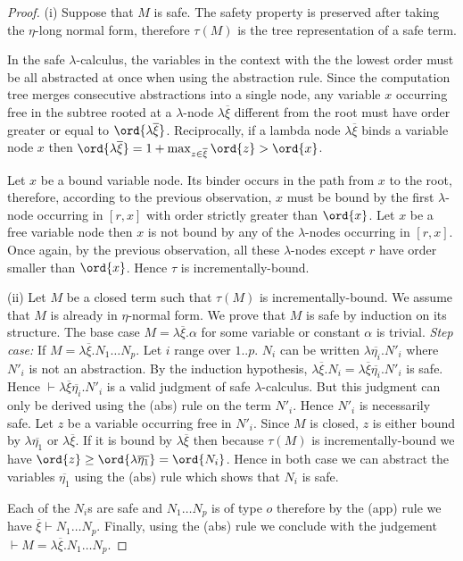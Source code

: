 \begin{proof}
(i) Suppose that $M$ is safe. The safety property is preserved after
taking the $\eta$-long normal form, therefore $\tau(M)$ is the tree representation of a safe term.

In the safe $\lambda$-calculus, the variables in the context with the the lowest order must be all abstracted
at once when using the abstraction rule. Since the computation
tree merges consecutive abstractions into a single node,
any variable $x$ occurring free in the subtree rooted at a $\lambda$-node $\lambda \overline{\xi}$ different from the root
must have order greater or equal to $\ord{\lambda \overline{\xi}}$. Reciprocally, if a lambda node
$\lambda \overline{\xi}$ binds a variable node $x$ then
$\ord{\lambda \overline{\xi}} = 1+\max_{z\in\overline{\xi}} \ord{z} > \ord{x}$.

Let $x$ be a bound variable node. Its binder occurs in the path from $x$
to the root, therefore, according to the previous observation, $x$ must be bound
by the first $\lambda$-node occurring in $[r,x]$ with order strictly
greater than $\ord{x}$. Let $x$ be a free variable node then $x$ is not bound
by any of the $\lambda$-nodes occurring in $[r,x]$. Once again, by the previous observation, all
these $\lambda$-nodes except $r$ have order smaller than $\ord{x}$. Hence
$\tau$ is incrementally-bound.

(ii) Let $M$ be a closed term such that $\tau(M)$ is incrementally-bound.
We assume that $M$ is already in $\eta$-normal form.
We prove that $M$ is safe by induction on its structure. The base case $M =
\lambda \overline{\xi} . \alpha$ for some variable or constant
$\alpha$ is trivial.
\emph{Step case:} If $M = \lambda \overline{\xi} . N_1 \ldots N_p$.
Let $i$ range over $1..p$. $N_i$ can be written $\lambda
\overline{\eta_i} . N'_i$ where $N'_i$ is not an abstraction. By the
induction hypothesis, $\lambda \overline{\xi} . N_i = \lambda
\overline{\xi} \overline{\eta_i} . N'_i$ is safe.
Hence $\vdash \lambda \overline{\xi} \overline{\eta_i} . N'_i$
is a valid judgment of safe $\lambda$-calculus.
But this judgment can only be derived using the (abs) rule on the term $N'_i$. Hence
$N'_i$ is necessarily safe. Let $z$ be a variable occurring free in
$N'_i$. Since $M$ is closed, $z$ is either bound by $\lambda
\overline{\eta_1}$ or $\lambda \overline{\xi}$. If it is bound by
$\lambda \overline{\xi}$ then because $\tau(M)$ is
incrementally-bound we have $\ord{z} \geq \ord{\lambda
\overline{\eta_1}} = \ord{N_i}$. Hence in both case we can abstract the variables
$\overline{\eta_1}$ using the (abs) rule which shows that $N_i$ is safe.

Each of the $N_i$s are safe and $N_1 \ldots N_p$ is of type $o$ therefore
by the (app) rule we have $\overline{\xi} \vdash N_1 \ldots N_p$. Finally, using the (abs) rule we conclude
with the judgement $\vdash M = \lambda \overline{\xi} . N_1 \ldots N_p$.
\end{proof}

